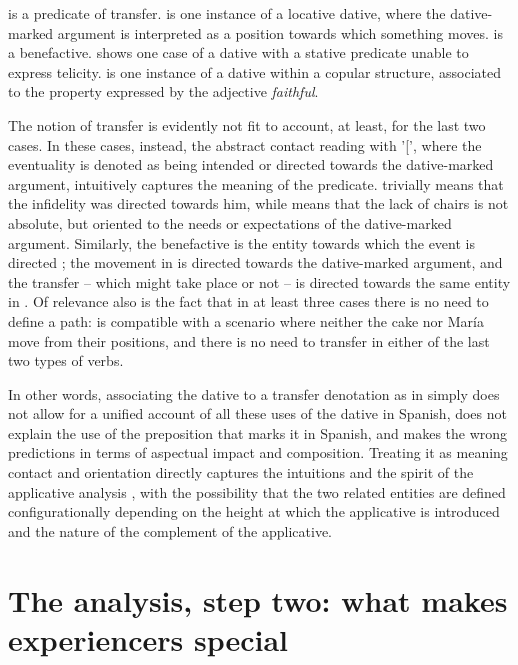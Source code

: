 \documentclass[output=paper,colorlinks,citecolor=brown,nonflat]{langsci/langscibook}
\begin{document}
 is a predicate of transfer.  is one instance of a locative dative, where the dative-marked argument is interpreted as a position towards which something moves.  is a benefactive.  shows one case of a dative with a stative predicate unable to express telicity.  is one instance of a dative within a copular structure, associated to the property expressed by the adjective \textit{faithful}. 

The notion of transfer is evidently not fit to account, at least, for the last two cases. In these cases, instead, the abstract contact reading with '[', where the eventuality is denoted as being intended or directed towards the dative-marked argument, intuitively captures the meaning of the predicate.  trivially means that the infidelity was directed towards him, while  means that the lack of chairs is not absolute, but oriented to the needs or expectations of the dative-marked argument. Similarly, the benefactive is the entity towards which the event is directed ; the movement in  is directed towards the dative-marked argument, and the transfer – which might take place or not – is directed towards the same entity in . Of relevance also is the fact that in at least three cases there is no need to define a path:  is compatible with a scenario where neither the cake nor María move from their positions, and there is no need to transfer in either of the last two types of verbs.  

In other words, associating the dative to a transfer denotation as in  simply does not allow for a unified account of all these uses of the dative in Spanish, does not explain the use of the preposition that marks it in Spanish, and makes the wrong predictions in terms of aspectual impact and composition. Treating it as meaning contact and orientation directly captures the intuitions and the spirit of the applicative analysis \citep{Cuervo2003}, with the possibility that the two related entities are defined configurationally depending on the height at which the applicative is introduced and the nature of the complement of the applicative.

\section{The analysis, step two: what makes experiencers special}\label{sec:fabregas:3}
\end{document}
